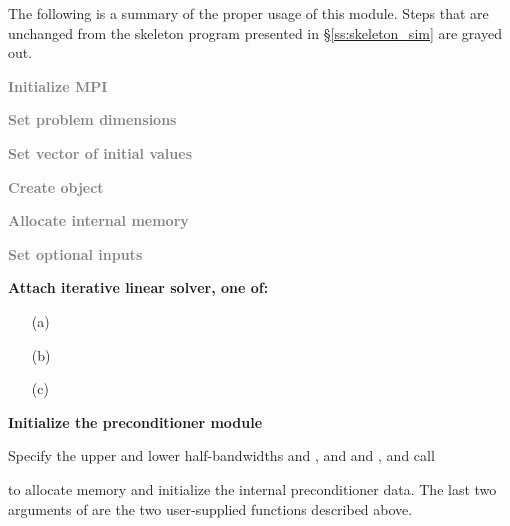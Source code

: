 The following is a summary of the proper usage of this module. Steps that are
unchanged from the skeleton program presented in \S\ref{ss:skeleton_sim} are grayed out.
\begin{Steps}
\item 
  \textcolor{gray}{\bf Initialize MPI}

\item
  \textcolor{gray}{\bf Set problem dimensions}

\item
  \textcolor{gray}{\bf Set vector of initial values}
 
\item
  \textcolor{gray}{\bf Create {\cvodes} object}

\item
  \textcolor{gray}{\bf Allocate internal memory}

\item
  \textcolor{gray}{\bf Set optional inputs}

\item \label{i:bbdpre_attach}
  {\bf Attach iterative linear solver, one of:}

  \begin{itemize}
  \item[(a) ] 
  \item[(b) ] 
  \item[(c) ] 
  \end{itemize}


\item \label{i:bbdpre_init}
  {\bf Initialize the {\cvbbdpre} preconditioner module}

  Specify the upper and lower half-bandwidths  and , and
   and , and call 


   to allocate memory and initialize the internal preconditioner data.
   The last two arguments of  are the two user-supplied 
   functions described above.


\end{Steps}
